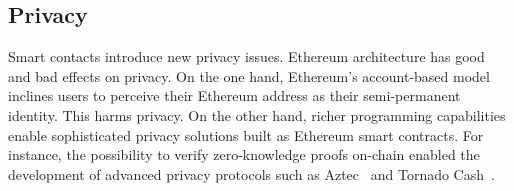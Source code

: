 \subsection{Privacy}
Smart contacts introduce new privacy issues.
Ethereum architecture has good and bad effects on privacy.
On the one hand, Ethereum's account-based model inclines users to perceive their Ethereum address as their semi-permanent identity.
This harms privacy.
On the other hand, richer programming capabilities enable sophisticated privacy solutions built as Ethereum smart contracts.
For instance, the possibility to verify zero-knowledge proofs on-chain enabled the development of advanced privacy protocols such as Aztec~\cite{Aztec} and Tornado Cash~\cite{TornadoCash}.

